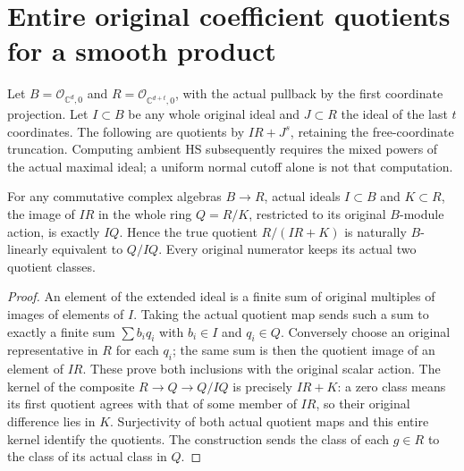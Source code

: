 \section{Entire original coefficient quotients for a smooth product}

Let $B=\mathcal O_{\mathbb C^d,0}$ and
$R=\mathcal O_{\mathbb C^{d+t},0}$, with the actual pullback by the first
coordinate projection. Let $I\subset B$ be any whole original ideal and
$J\subset R$ the ideal of the last $t$ coordinates. The following are
quotients by $IR+J^s$, retaining the free-coordinate truncation. Computing
ambient HS subsequently requires the mixed powers of the actual maximal
ideal; a uniform normal cutoff alone is not that computation.

\begin{lemma}
\label{hir:actual-product-entire-extension-ideal-module-quotient}
\leanok
For any commutative complex algebras $B\to R$, actual ideals $I\subset B$
and $K\subset R$, the image of $IR$ in the whole ring $Q=R/K$, restricted
to its original $B$-module action, is exactly $I Q$. Hence the true
quotient $R/(IR+K)$ is naturally $B$-linearly equivalent to $Q/IQ$.
Every original numerator keeps its actual two quotient classes.
\end{lemma}
\begin{proof}
An element of the extended ideal is a finite sum of original multiples
of images of elements of $I$. Taking the actual quotient map sends such
a sum to exactly a finite sum $\sum b_iq_i$ with $b_i\in I$ and $q_i\in Q$.
Conversely choose an original representative in $R$ for each $q_i$; the
same sum is then the quotient image of an element of $IR$. These prove
both inclusions with the original scalar action. The kernel of the
composite $R\to Q\to Q/IQ$ is precisely $IR+K$: a zero class means its
first quotient agrees with that of some member of $IR$, so their
original difference lies in $K$. Surjectivity of both actual quotient
maps and this entire kernel identify the quotients. The construction
sends the class of each $g\in R$ to the class of its actual class in $Q$.
\end{proof}

